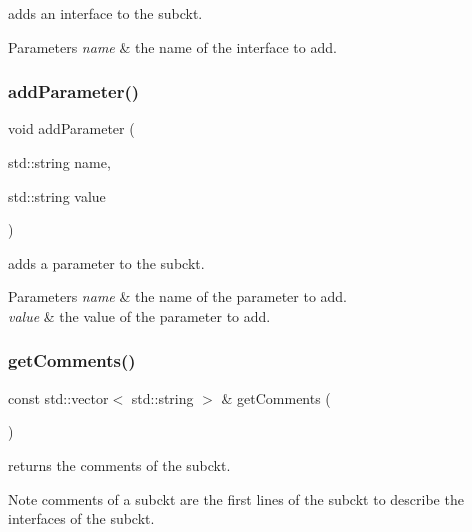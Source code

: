 adds an interface to the subckt. 


\begin{DoxyParams}{Parameters}
{\em name} & the name of the interface to add. \\
\hline
\end{DoxyParams}
\mbox{\label{class_s_p_i_c_e_1_1_subckt_ab3ab147a16bc490ce96db905a4ca271c}} 
\subsubsection{\texorpdfstring{add\+Parameter()}{addParameter()}}
{\footnotesize\ttfamily void add\+Parameter (\begin{DoxyParamCaption}\item[{std\+::string}]{name,  }\item[{std\+::string}]{value }\end{DoxyParamCaption})}



adds a parameter to the subckt. 


\begin{DoxyParams}{Parameters}
{\em name} & the name of the parameter to add. \\
\hline
{\em value} & the value of the parameter to add. \\
\hline
\end{DoxyParams}
\mbox{\label{class_s_p_i_c_e_1_1_subckt_aa4a73ef909ceb8d442ed2f205967613a}} 
\subsubsection{\texorpdfstring{get\+Comments()}{getComments()}}
{\footnotesize\ttfamily const std\+::vector$<$ std\+::string $>$ \& get\+Comments (\begin{DoxyParamCaption}{ }\end{DoxyParamCaption})\hspace{0.3cm}{\ttfamily [inline]}}



returns the comments of the subckt. 

\begin{DoxyNote}{Note}
comments of a subckt are the first lines of the subckt to describe the interfaces of the subckt. 
\end{DoxyNote}
